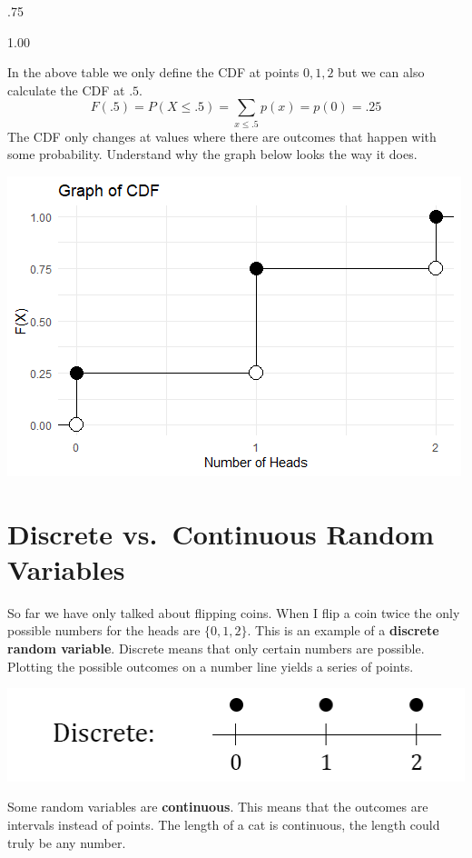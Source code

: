 \documentclass[
]{book}
\theoremstyle{definition}
\theoremstyle{definition}
\theoremstyle{definition}
\theoremstyle{remark}
\begin{document}
.75

1.00

In the above table we only define the CDF at points \(0,1,2\) but we can also calculate the CDF at \(.5\). \[F(.5)=P(X \leq .5) = \displaystyle\sum_{x \leq .5} p(x) = p(0) = .25\]
The CDF only changes at values where there are outcomes that happen with some probability. Understand why the graph below looks the way it does.

\includegraphics{Pictures/04-RV/CDFPlot.PNG}

\hypertarget{discrete-vs.-continuous-random-variables}{%
\section{Discrete vs.~Continuous Random Variables}\label{discrete-vs.-continuous-random-variables}}

So far we have only talked about flipping coins. When I flip a coin twice the only possible numbers for the heads are \(\{0,1,2\}\). This is an example of a \textbf{discrete random variable}. Discrete means that only certain numbers are possible. Plotting the possible outcomes on a number line yields a series of points.

\includegraphics{Pictures/04-RV/discrete.PNG}

Some random variables are \textbf{continuous}. This means that the outcomes are intervals instead of points. The length of a cat is continuous, the length could truly be any number.
\end{document}
